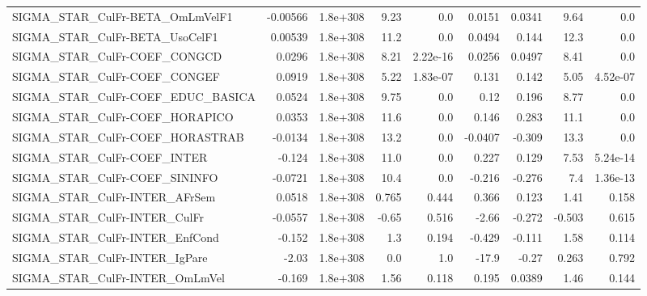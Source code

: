 \begin{tabular}{lrrrrrrrr}
SIGMA\_STAR\_CulFr-BETA\_OmLmVelF1       &    -0.00566 &     1.8e+308 &     9.23 &      0.0 &     0.0151 &      0.0341 &         9.64 &           0.0 \\
SIGMA\_STAR\_CulFr-BETA\_UsoCelF1        &     0.00539 &     1.8e+308 &     11.2 &      0.0 &     0.0494 &       0.144 &         12.3 &           0.0 \\
SIGMA\_STAR\_CulFr-COEF\_CONGCD          &      0.0296 &     1.8e+308 &     8.21 & 2.22e-16 &     0.0256 &      0.0497 &         8.41 &           0.0 \\
SIGMA\_STAR\_CulFr-COEF\_CONGEF          &      0.0919 &     1.8e+308 &     5.22 & 1.83e-07 &      0.131 &       0.142 &         5.05 &      4.52e-07 \\
SIGMA\_STAR\_CulFr-COEF\_EDUC\_BASICA     &      0.0524 &     1.8e+308 &     9.75 &      0.0 &       0.12 &       0.196 &         8.77 &           0.0 \\
SIGMA\_STAR\_CulFr-COEF\_HORAPICO        &      0.0353 &     1.8e+308 &     11.6 &      0.0 &      0.146 &       0.283 &         11.1 &           0.0 \\
SIGMA\_STAR\_CulFr-COEF\_HORASTRAB       &     -0.0134 &     1.8e+308 &     13.2 &      0.0 &    -0.0407 &      -0.309 &         13.3 &           0.0 \\
SIGMA\_STAR\_CulFr-COEF\_INTER           &      -0.124 &     1.8e+308 &     11.0 &      0.0 &      0.227 &       0.129 &         7.53 &      5.24e-14 \\
SIGMA\_STAR\_CulFr-COEF\_SININFO         &     -0.0721 &     1.8e+308 &     10.4 &      0.0 &     -0.216 &      -0.276 &          7.4 &      1.36e-13 \\
SIGMA\_STAR\_CulFr-INTER\_AFrSem         &      0.0518 &     1.8e+308 &    0.765 &    0.444 &      0.366 &       0.123 &         1.41 &         0.158 \\
SIGMA\_STAR\_CulFr-INTER\_CulFr          &     -0.0557 &     1.8e+308 &    -0.65 &    0.516 &      -2.66 &      -0.272 &       -0.503 &         0.615 \\
SIGMA\_STAR\_CulFr-INTER\_EnfCond        &      -0.152 &     1.8e+308 &      1.3 &    0.194 &     -0.429 &      -0.111 &         1.58 &         0.114 \\
SIGMA\_STAR\_CulFr-INTER\_IgPare         &       -2.03 &     1.8e+308 &      0.0 &      1.0 &      -17.9 &       -0.27 &        0.263 &         0.792 \\
SIGMA\_STAR\_CulFr-INTER\_OmLmVel        &      -0.169 &     1.8e+308 &     1.56 &    0.118 &      0.195 &      0.0389 &         1.46 &         0.144 \\

\end{tabular}
